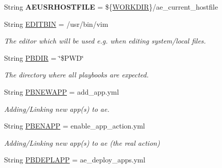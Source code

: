 \begin{DoxyCompactItemize}
String {\bfseries A\+E\+U\+S\+R\+H\+O\+S\+T\+F\+I\+LE} = \$\{\mbox{\hyperlink{ansible__engine_8sh_a65ed767ae8d8b098d10bef5621b44918}{W\+O\+R\+K\+D\+IR}}\}/ae\+\_\+current\+\_\+hostfile
\item 
\mbox{\label{ansible__engine_8sh_a90f3e5b40645b8ebe43db8f146fbaded}} 
String \mbox{\hyperlink{ansible__engine_8sh_a90f3e5b40645b8ebe43db8f146fbaded}{E\+D\+I\+T\+B\+IN}} = /usr/bin/vim
\begin{DoxyCompactList}\small\item\em The editor which will be used e.\+g. when editing system/local files. \end{DoxyCompactList}\item 
\mbox{\label{ansible__engine_8sh_ad6dc768bd04c52f11f0a3416c7157576}} 
String \mbox{\hyperlink{ansible__engine_8sh_ad6dc768bd04c52f11f0a3416c7157576}{P\+B\+D\+IR}} = \char`\"{}\$P\+WD\char`\"{}
\begin{DoxyCompactList}\small\item\em The directory where all playbooks are expected. \end{DoxyCompactList}\item 
\mbox{\label{ansible__engine_8sh_a06cf6d51b3ccc9f90e9865f2566e2d13}} 
String \mbox{\hyperlink{ansible__engine_8sh_a06cf6d51b3ccc9f90e9865f2566e2d13}{P\+B\+N\+E\+W\+A\+PP}} = add\+\_\+app.\+yml
\begin{DoxyCompactList}\small\item\em Adding/\+Linking new app(s) to ae. \end{DoxyCompactList}\item 
\mbox{\label{ansible__engine_8sh_a8c588b65ccd29bf03f0ea2f36124e707}} 
String \mbox{\hyperlink{ansible__engine_8sh_a8c588b65ccd29bf03f0ea2f36124e707}{P\+B\+E\+N\+A\+PP}} = enable\+\_\+app\+\_\+action.\+yml
\begin{DoxyCompactList}\small\item\em Adding/\+Linking new app(s) to ae (the real action) \end{DoxyCompactList}\item 
\mbox{\label{ansible__engine_8sh_a04d2a765ad48aee391ce970589657845}} 
String \mbox{\hyperlink{ansible__engine_8sh_a04d2a765ad48aee391ce970589657845}{P\+B\+D\+E\+P\+L\+A\+PP}} = ae\+\_\+deploy\+\_\+apps.\+yml

\end{DoxyCompactItemize}
